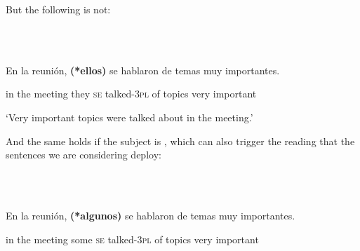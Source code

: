 \documentclass[output=paper]{langsci/langscibook}
\begin{document}
\begin{styleHTMLPreformatted}
But the following is not:
\end{styleHTMLPreformatted}

\begin{styleHTMLPreformatted}
\ea%
    \label{ex:key:40}
    \gll\\
        \\
    \glt
    \z

\end{styleHTMLPreformatted}

\begin{styleHTMLPreformatted}
En la   reunión, \textbf{(*ellos)}  se   hablaron     de  temas muy importantes.  
\end{styleHTMLPreformatted}

\begin{styleHTMLPreformatted}
  in  the  meeting     they   \textsc{se} talked-\textsc{3pl}  of  topics very important
\end{styleHTMLPreformatted}

\begin{styleHTMLPreformatted}
  ‘Very important topics were talked about in the meeting.’
\end{styleHTMLPreformatted}

\begin{styleHTMLPreformatted}
And the same holds if the subject is , which can also trigger the  reading that the sentences we are considering deploy:
\end{styleHTMLPreformatted}

\begin{styleHTMLPreformatted}
\ea%
    \label{ex:key:41}
    \gll\\
        \\
    \glt
    \z

\end{styleHTMLPreformatted}

\begin{styleHTMLPreformatted}
En la    reunión, \textbf{(*algunos)} se hablaron   de  temas  muy importantes.
\end{styleHTMLPreformatted}

\begin{styleHTMLPreformatted}
  in   the meeting    some     \textsc{se} talked-\textsc{3pl}   of  topics  very important
\end{styleHTMLPreformatted}
\end{document}
